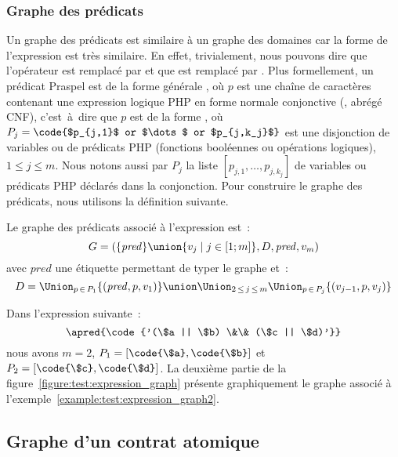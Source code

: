 \subsubsection{Graphe des prédicats}

Un graphe des prédicats est similaire à un graphe des domaines car la forme de
l'expression est très similaire. En effet, trivialement, nous pouvons dire que
l'opérateur  est remplacé par \code{\&\&} et que  est
remplacé par \code{||}. Plus formellement, un prédicat Praspel est de la forme
générale , où $p$ est une chaîne de caractères contenant une expression
logique PHP en forme normale conjonctive (,
abrégé CNF), c'est~à~dire que $p$ est de la forme , où $P_j = \code{$p_{j,1}$ or $\dots$ or $p_{j,k_j}$}$ est une
disjonction de variables ou de prédicats PHP (fonctions booléennes ou opérations
logiques), $1 \leq j \leq m$. Nous notons aussi par $P_j$ la liste $[p_{j,1},
\dots, p_{j,k_j}]$ de variables ou prédicats PHP déclarés dans la conjonction.
Pour construire le graphe des prédicats, nous utilisons la définition suivante.

\begin{definition}

Le {\strong graphe des prédicats} associé à l'expression  est~:
%
$$G = (\{\mathit{pred}\} \union \{v_j \;\vert\; j \in [1; m]\}, D, \mathit{pred}, v_m)$$
%
avec $\mathit{pred}$ une étiquette permettant de typer le graphe et~:
%
$$D = \Union_{p \,\in\, P_1} \{(\mathit{pred}, p, v_1)\} \union
      \Union_{2 \,\leq\, j \,\leq\, m}
      \Union_{p \,\in\, P_j} \{(v_{j - 1}, p, v_j)\}$$

\end{definition}

\begin{example}
\label{example:test:expression_graph2}

Dans l'expression suivante~:
%
$$\apred{\code{'(\$a || \$b) \&\& (\$c || \$d)'}}$$
%
nous avons $m = 2$, $P_1 = [\code{\$a}, \code{\$b}]$ et $P_2 = [\code{\$c},
\code{\$d}]$. La deuxième partie de la
figure~\ref{figure:test:expression_graph} présente graphiquement le graphe
associé à l'exemple~\ref{example:test:expression_graph2}.

\end{example}

\subsection{Graphe d'un contrat atomique}
\label{subsection:test:atomic_graph}

